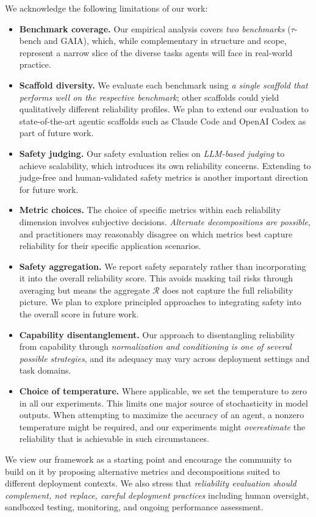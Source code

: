 \documentclass[11pt]{article}
\newcounter{dimension}
\begin{document}
We acknowledge the following limitations of our work:
\begin{itemize}[leftmargin=*,itemsep=2pt]
\item \textbf{Benchmark coverage.} Our empirical analysis covers \emph{two benchmarks} ($\tau$-bench and GAIA), which, while complementary in structure and scope, represent a narrow slice of the diverse tasks agents will face in real-world practice.
\item \textbf{Scaffold diversity.} We evaluate each benchmark using \emph{a single scaffold that performs well on the respective benchmark}; other scaffolds could yield qualitatively different reliability profiles. We plan to extend our evaluation to state-of-the-art agentic scaffolds such as Claude Code and OpenAI Codex as part of future work.
\item \textbf{Safety judging.} Our safety evaluation relies on \emph{LLM-based judging} to achieve scalability, which introduces its own reliability concerns. Extending to judge-free and human-validated safety metrics is another important direction for future work.
\item \textbf{Metric choices.} The choice of specific metrics within each reliability dimension involves subjective decisions. \emph{Alternate decompositions are possible}, and practitioners may reasonably disagree on which metrics best capture reliability for their specific application scenarios.
\item \textbf{Safety aggregation.} We report safety separately rather than incorporating it into the overall reliability score. This avoids masking tail risks through averaging but means the aggregate $\mathcal{R}$ does not capture the full reliability picture. We plan to explore principled approaches to integrating safety into the overall score in future work.
\item \textbf{Capability disentanglement.} Our approach to disentangling reliability from capability through \emph{normalization and conditioning is one of several possible strategies}, and its adequacy may vary across deployment settings and task domains.
\item \textbf{Choice of temperature.} Where applicable, we set the temperature to zero in all our experiments. This limits one major source of stochasticity in model outputs. When attempting to maximize the accuracy of an agent, a nonzero temperature might be required, and our experiments might  {\em overestimate} the reliability that is achievable in such circumstances. 
\end{itemize}
We view our framework as a starting point and encourage the community to build on it by proposing alternative metrics and decompositions suited to different deployment contexts.
We also stress that \emph{reliability evaluation should complement, not replace, careful deployment practices} including human oversight, sandboxed testing, monitoring, and ongoing performance assessment.
\end{document}
